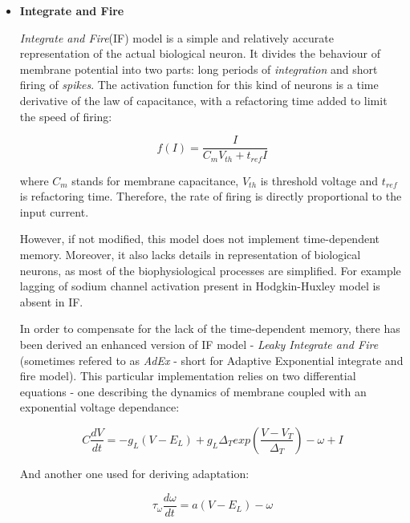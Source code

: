 \begin{itemize}

\item \textbf{Integrate and Fire}

\emph{Integrate and Fire}(IF) model is a simple and relatively accurate representation of the actual biological neuron.
It divides the behaviour of membrane potential into two parts: long periods of \emph{integration} and short firing of \emph{spikes}. The activation function for this kind of neurons is
a time derivative of the law of capacitance, with a refactoring time added to limit the speed of firing:
\begin{center}
\begin{equation}f(I) = \frac{I}{C_{m}V_{th} + t_{ref}I}\end{equation}
\end{center}
where $C_{m}$ stands for membrane capacitance, $V_{th}$ is threshold voltage and $t_{ref}$ is refactoring time. Therefore, the rate of firing is directly proportional to the input current.\cite{WulframGerstner2002}

However, if not modified, this model does not implement time-dependent memory. Moreover, it also lacks details in representation of biological neurons, as most of the biophysiological 
processes are simplified. For example lagging of sodium channel activation present in Hodgkin-Huxley model is absent in IF.

In order to compensate for the lack of the time-dependent memory, there has been derived an enhanced version of IF model - \emph{Leaky Integrate and Fire} (sometimes refered to as \emph{AdEx} - short for Adaptive Exponential integrate and fire model).\cite{IFModel} This particular implementation relies on two differential equations - one describing the dynamics of membrane coupled with an exponential voltage dependance:

\begin{center}
\begin{equation}C\frac{dV}{dt} = -g_{L}(V-E_{L}) + g_{L}\Delta_{T}exp(\frac{V-V_{T}}{\Delta_{T}})-\omega + I\end{equation}
\end{center}

And another one used for deriving adaptation:

\begin{center}
\begin{equation}\tau_{\omega} \frac{d\omega}{dt} = a(V-E_{L}) -\omega \end{equation}
\end{center}


\end{itemize}
